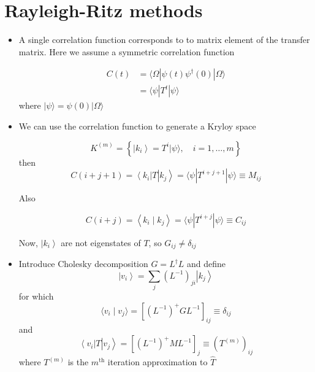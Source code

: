 \section{Rayleigh-Ritz methods}

\begin{itemize}
  \item A single correlation function corresponds to to matrix element of the transfer matrix. Here we assume a symmetric correlation function

\begin{equation}
\begin{aligned}
C(t) & =\langle \Omega| \psi(t) \psi^{\dagger}(0)|\Omega\rangle \\
& =\langle\psi| T^{t}|\psi\rangle
\end{aligned}
\end{equation}
where $|\psi\rangle=\psi(0)|\Omega\rangle$
  \item We can use the correlation function to generate a Kryloy space


\begin{equation}
K^{(m)}=\left\{\left|k_{i}\right\rangle=T^{i}|\psi\rangle, \quad i=1, \ldots, m\right\}
 \end{equation}
then
\begin{equation}
C(i+j+1)=\left\langle k_{i}\right| T\left|k_{j}\right\rangle=\langle\psi|T^{i+j+1}|\psi\rangle \equiv M_{i j}
 \end{equation}

Also

\begin{equation}
C(i+j)=\left\langle k_{i} \mid k_{j}\right\rangle=\langle\psi| T^{i+j}|\psi\rangle \equiv C_{i j}
\end{equation}

Now, \(\left|k_{i}\right\rangle\) are not eigenstates of \(T\), so \(G_{i j} \neq \delta_{i j}\)

  \item Introduce Cholesky decomposition \(G=L^{\dagger} L\) and define
\begin{equation}
\left| v_{i}\right\rangle=\sum_j(L^{-1})_{ji} \left|k_j\right\rangle
\end{equation}
for which
\begin{equation}
\langle v_{i}\mid v_{j}\rangle=\left[\left(L^{-1}\right)^{+} G L^{-1}\right]_{ij} \equiv\delta_{ij}
\end{equation}
and
\begin{equation}
\left\langle v_{i}\right| T\left|v_{j}\right\rangle=\left[\left(L^{-1}\right)^{+} M L^{-1}\right]_{j} \equiv\left(T^{(m)}\right)_{ij}
\end{equation}
where $T^{(m)}$ is the $m^{\text{th}}$ iteration approximation to $\hat T$


\end{itemize}
